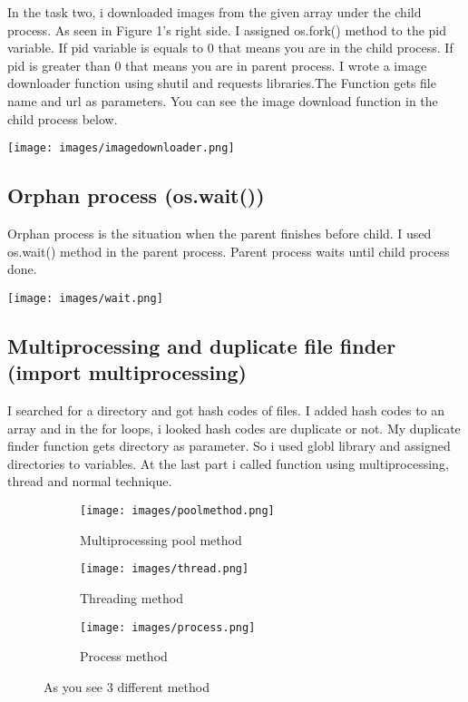 \documentclass[onecolumn]{article}
\begin{document}
In the task two, i downloaded images from the given array under the child process. As seen in Figure 1's right side. I assigned os.fork() method to the pid variable. If pid variable is equals to 0 that means you are in the child process. If pid is greater than 0 that means you are in parent process. I wrote a image downloader function using shutil and requests libraries.The Function gets file name and url as parameters. You can see the image download function in the child process below.

\texttt{[image: images/imagedownloader.png]}

\subsection{Orphan process (os.wait())}

Orphan process is the situation when the parent finishes before child. I used os.wait() method in the parent process. Parent process waits until child process done. 

\texttt{[image: images/wait.png]}

\subsection{Multiprocessing and duplicate file finder (import multiprocessing)}

I searched for a directory and got hash codes of files. I added hash codes to an array and in the for loops, i looked hash codes are duplicate or not. My duplicate finder function gets directory as parameter. So i used globl library and assigned directories to variables. At the last part i called function using multiprocessing, thread and normal technique.

\begin{figure}[ht]
\begin{subfigure}{\textwidth}
  \centering
  \texttt{[image: images/poolmethod.png]}  
  \caption{Multiprocessing pool method}
  \label{fig:sub-first}
\end{subfigure}
\begin{subfigure}{\textwidth}
  \centering
  \texttt{[image: images/thread.png]}  
  \caption{Threading method}
  \label{fig:sub-second}
\end{subfigure}
\begin{subfigure}{\textwidth}
  \centering
  \texttt{[image: images/process.png]}  
  \caption{Process method}
  \label{fig:sub-third}
\end{subfigure}

\caption{As you see 3 different method }
\label{fig:fig}
\end{figure}
\end{document}
